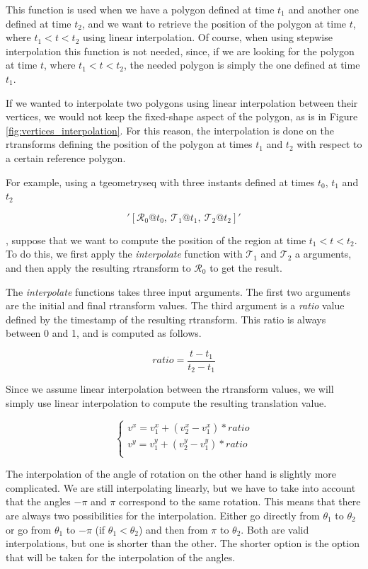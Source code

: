 This function is used when we have a polygon defined at time $t_1$ and another one defined at time $t_2$, and we want to retrieve the position of the polygon at time $t$, where $t_1 < t < t_2$ using linear interpolation. Of course, when using stepwise interpolation this function is not needed, since, if we are looking for the polygon at time $t$, where $t_1 < t < t_2$, the needed polygon is simply the one defined at time $t_1$.

If we wanted to interpolate two polygons using linear interpolation between their vertices, we would not keep the fixed-shape aspect of the polygon, as is in Figure \ref{fig:vertices_interpolation}. For this reason, the interpolation is done on the rtransforms defining the position of the polygon at times $t_1$ and $t_2$ with respect to a certain reference polygon.

For example, using a tgeometryseq with three instants defined at times $t_0$, $t_1$ and $t_2$

\[
    '[\mathcal{R}_0@t_0,\ \mathcal{T}_1@t_1,\ \mathcal{T}_2@t_2]'
\]

, suppose that we want to compute the position of the region at time $t_1 < t < t_2$. To do this, we first apply the \textit{interpolate} function with $\mathcal{T}_1$ and $\mathcal{T}_2$ a arguments, and then apply the resulting rtransform to $\mathcal{R}_0$ to get the result.

The \textit{interpolate} functions takes three input arguments. The first two arguments are the initial and final rtransform values. The third argument is a \textit{ratio} value defined by the timestamp of the resulting rtransform. This ratio is always between 0 and 1, and is computed as follows.

\[
    ratio = \frac{t - t_1}{t_2 - t_1}
\]

Since we assume linear interpolation between the rtransform values, we will simply use linear interpolation to compute the resulting translation value.

\[
    \begin{cases}
        v^x = v_1^x + (v_2^x - v_1^x) * ratio \\
        v^y = v_1^y + (v_2^y - v_1^y) * ratio \\
    \end{cases}
\]

The interpolation of the angle of rotation on the other hand is slightly more complicated. We are still interpolating linearly, but we have to take into account that the angles $-\pi$ and $\pi$ correspond to the same rotation. This means that there are always two possibilities for the interpolation. Either go directly from $\theta_1$ to $\theta_2$ or go from $\theta_1$ to $-\pi$ (if $\theta_1 < \theta_2$) and then from $\pi$ to $\theta_2$. Both are valid interpolations, but one is shorter than the other. The shorter option is the option that will be taken for the interpolation of the angles.

